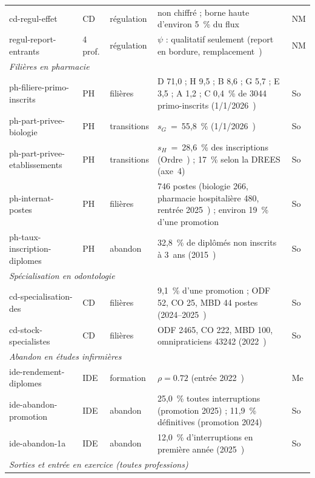 \begin{table}[p]
\begin{tabular}{p{2.6cm}p{1.1cm}p{1.6cm}p{6.6cm}p{0.5cm}}
cd-regul-effet & CD & régulation & non chiffré ; borne haute d'environ 5~\%\derive{} du flux & NM \\
regul-report-entrants & 4 prof. & régulation & $\psi$ : qualitatif seulement (report en bordure, remplacement~\cite{a1-irdes270,a1-ccomptes2024}) & NM \\
\midrule
\multicolumn{5}{l}{\emph{Filières en pharmacie}} \\
ph-filiere-primo-inscrits & PH & filières & D 71,0 ; H 9,5 ; B 8,6 ; G 5,7 ; E 3,5 ; A 1,2 ; C 0,4~\% de \num{3044} primo-inscrits (1/1/2026~\cite{a1-cnop2025}) & So \\
ph-part-privee-biologie & PH & transitions & $s_G$~=~55,8~\%\derive{} (1/1/2026~\cite{a1-cnop2025}) & So \\
ph-part-privee-etablissements & PH & transitions & $s_H$~=~28,6~\%\derive{} des inscriptions (Ordre~\cite{a1-cnop2025}) ; 17~\% selon la DREES (axe~4) & So \\
ph-internat-postes & PH & filières & \num{746} postes (biologie \num{266}, pharmacie hospitalière \num{480}, rentrée 2025~\cite{a1-arrete2024pharma}) ; environ 19~\%\derive{} d'une promotion & So \\
ph-taux-inscription-diplomes & PH & abandon & 32,8~\% de diplômés non inscrits à 3~ans (2015~\cite{a1-cnop2016}) & So \\
\midrule
\multicolumn{5}{l}{\emph{Spécialisation en odontologie}} \\
cd-specialisation-des & CD & filières & 9,1~\%\derive{} d'une promotion ; ODF 52, CO 25, MBD 44 postes (2024--2025~\cite{a1-arrete2024odonto}) & So \\
cd-stock-specialistes & CD & filières & ODF \num{2465}, CO \num{222}, MBD \num{100}, omnipraticiens \num{43242} (2022~\cite{a1-oncd2022}) & So \\
\midrule
\multicolumn{5}{l}{\emph{Abandon en études infirmières}} \\
ide-rendement-diplomes & IDE & formation & $\rho = \num{0.72}$\mesure{} (entrée 2022~\cite{a1-drees491}) & Me \\
ide-abandon-promotion & IDE & abandon & 25,0~\% toutes interruptions (promotion 2025) ; 11,9~\% définitives (promotion 2024)~\cite{a1-drees491} & So \\
ide-abandon-1a & IDE & abandon & 12,0~\% d'interruptions en première année (2025~\cite{a1-drees491}) & So \\
\midrule
\multicolumn{5}{l}{\emph{Sorties et entrée en exercice (toutes professions)}} \\

\end{tabular}
\end{table}
